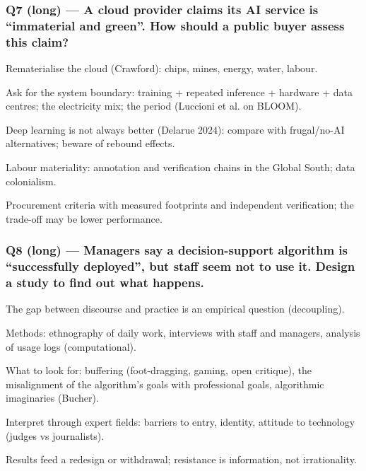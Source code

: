 \documentclass[11pt,a4paper]{article}
\newcommand{\blk}[1]{{\setlength{\fboxsep}{2pt}\colorbox{ink}{\sffamily\footnotesize\bfseries\color{white}\,#1\,}}}
\begin{document}
\subsubsection*{Q7 (long) — A cloud provider claims its AI service is “immaterial and green”. How should a public buyer assess this claim?}
\begin{description}[leftmargin=1.2cm,style=sameline]
\item[\blk{F}] Rematerialise the cloud (Crawford): chips, mines, energy, water, labour.
\item[\blk{A1}] Ask for the system boundary: training + repeated inference + hardware + data centres; the electricity mix; the period (Luccioni et al. on BLOOM).
\item[\blk{A2}] Deep learning is not always better (Delarue 2024): compare with frugal/no-AI alternatives; beware of rebound effects.
\item[\blk{A3}] Labour materiality: annotation and verification chains in the Global South; data colonialism.
\item[\blk{R}] Procurement criteria with measured footprints and independent verification; the trade-off may be lower performance.
\end{description}
\subsubsection*{Q8 (long) — Managers say a decision-support algorithm is “successfully deployed”, but staff seem not to use it. Design a study to find out what happens.}
\begin{description}[leftmargin=1.2cm,style=sameline]
\item[\blk{F}] The gap between discourse and practice is an empirical question (decoupling).
\item[\blk{A1}] Methods: ethnography of daily work, interviews with staff and managers, analysis of usage logs (computational).
\item[\blk{A2}] What to look for: buffering (foot-dragging, gaming, open critique), the misalignment of the algorithm’s goals with professional goals, algorithmic imaginaries (Bucher).
\item[\blk{A3}] Interpret through expert fields: barriers to entry, identity, attitude to technology (judges vs journalists).
\item[\blk{R}] Results feed a redesign or withdrawal; resistance is information, not irrationality.
\end{description}
\end{document}
